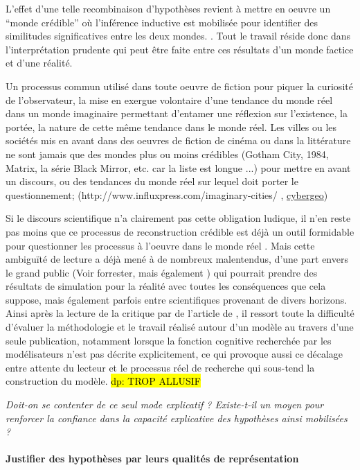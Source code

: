 L'effet d'une telle recombinaison d'hypothèses revient à mettre en oeuvre un \enquote{monde crédible} où l'inférence inductive est mobilisée pour identifier des similitudes significatives entre les deux mondes. \autocites{Livet2006, Phan2008}. Tout le travail réside donc dans l'interprétation prudente qui peut être faite entre ces résultats d'un monde factice et d'une réalité.

Un processus commun utilisé dans toute oeuvre de fiction pour piquer la curiosité de l'observateur, la mise en exergue volontaire d'une tendance du monde réel dans un monde imaginaire permettant d'entamer une réflexion sur l'existence, la portée, la nature de cette même tendance dans le monde réel. Les villes ou les sociétés mis en avant dans des oeuvres de fiction de cinéma ou dans la littérature ne sont jamais que des mondes plus ou moins crédibles (Gotham City, 1984, Matrix, la série Black Mirror, etc. car la liste est longue ...)  pour mettre en avant un discours, ou des tendances du monde réel sur lequel doit porter le questionnement; (http://www.influxpress.com/imaginary-cities/ , \href{http://cybergeo.revues.org/1170#tocto1n9?}{cybergeo})

Si le discours scientifique n'a clairement pas cette obligation ludique, il n'en reste pas moins que ce processus de reconstruction crédible est déjà un outil formidable pour questionner les processus à l'oeuvre dans le monde réel . Mais cette ambiguïté de lecture a déjà mené à de nombreux malentendus, d'une part envers le grand public (Voir forrester, mais également ) qui pourrait prendre des résultats de simulation pour la réalité avec toutes les conséquences que cela suppose, mais également parfois entre scientifiques provenant de divers horizons. Ainsi après la lecture de la critique par \textcite{Chattoe2011} de l'article de \textcite{Yanoff2009}, il ressort toute la difficulté d'évaluer la méthodologie et le travail réalisé autour d'un modèle au travers d'une seule publication, notamment lorsque la fonction cognitive recherchée par les modélisateurs n'est pas décrite explicitement, ce qui provoque aussi ce décalage entre attente du lecteur et le processus réel de recherche qui sous-tend la construction du modèle. \hl{dp: TROP ALLUSIF}

\textit{Doit-on se contenter de ce seul mode explicatif ? Existe-t-il un moyen pour renforcer la confiance dans la capacité explicative des hypothèses ainsi mobilisées ? }

\paragraph{Justifier des hypothèses par leurs qualités de représentation}
\label{justifier_hypothese}

